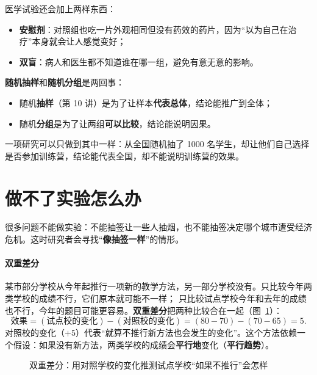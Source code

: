 医学试验还会加上两样东西：
\begin{itemize}
  \item \textbf{安慰剂}：对照组也吃一片外观相同但没有药效的药片，因为“以为自己在治疗”本身就会让人感觉变好；
  \item \textbf{双盲}：病人和医生都不知道谁在哪一组，避免有意无意的影响。
\end{itemize}

\begin{pitfall}
\textbf{随机抽样}和\textbf{随机分组}是两回事：
\begin{itemize}
  \item 随机\textbf{抽样}（第 10 讲）是为了让样本\textbf{代表总体}，结论能推广到全体；
  \item 随机\textbf{分组}是为了让两组\textbf{可以比较}，结论能说明因果。
\end{itemize}
一项研究可以只做到其中一样：从全国随机抽了 1000 名学生，却让他们自己选择是否参加训练营，结论能代表全国，却不能说明训练营的效果。
\end{pitfall}

\section{做不了实验怎么办}

很多问题不能做实验：不能抽签让一些人抽烟，也不能抽签决定哪个城市遭受经济危机。这时研究者会寻找“\textbf{像抽签一样}”的情形。

\paragraph{双重差分}
某市部分学校从今年起推行一项新的教学方法，另一部分学校没有。只比较今年两类学校的成绩不行，它们原本就可能不一样；
只比较试点学校今年和去年的成绩也不行，今年的题目可能更容易。\textbf{双重差分}把两种比较合在一起（图~\ref{fig:es-did}）：
\[
  \text{效果}=(\text{试点校的变化})-(\text{对照校的变化})=(80-70)-(70-65)=5 .
\]
对照校的变化（$+5$）代表“就算不推行新方法也会发生的变化”。这个方法依赖一个假设：如果没有新方法，两类学校的成绩会\textbf{平行地}变化（\textbf{平行趋势}）。

\begin{figure}[!htbp]
\centering
{}
\caption{双重差分：用对照学校的变化推测试点学校“如果不推行”会怎样}
\label{fig:es-did}
\end{figure}

